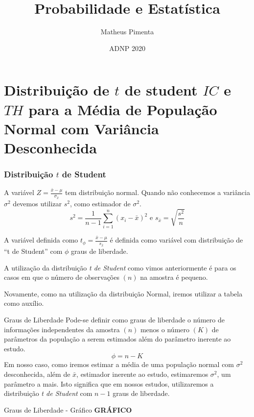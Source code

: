 \documentclass[hyperref={pdfpagelabels=false}]{beamer}
\title{Probabilidade e Estatística}
\author[Matheus Pimenta]{Matheus Pimenta}
\institute[UTFPR-CP]{\normalsize Universidade Tecnológica Federal do Paraná \\
	Câmpus Cornélio Procópio
}
\date{ADNP 2020}
\begin{document}
	
\begin{frame}
\titlepage
\end{frame} 




\section{Distribuição de $t$ de student $IC$ e $TH$ para a Média de População Normal com Variância Desconhecida} 

\begin{frame}
\frametitle{Distribuição $t$ de Student}
A variável $Z = \displaystyle \frac{\bar{x} - \mu}{\sigma_{\bar{x}}}$ tem distribuição normal. Quando não conhecemos a variância $\sigma^2$ devemos utilizar $s^2$, como estimador de $\sigma^2$. \pause
$$s^2 = \displaystyle \frac{1}{n-1}\sum_{i=1}^{n}(x_i - \bar{x})^2 \text{ e } s_{\bar{x}}=\sqrt{\frac{s^2}{n}}$$ \pause

A variável definida como $t_{\phi} = \displaystyle \frac{\bar{x} - \mu}{s_{\bar{x}}}$ é definida como variável com distribuição de ``t de Student'' com $\phi$ graus de liberdade.

\pause
A utilização da distribuição \emph{t de Student} como vimos anteriormente é para os casos em que o número de observações $(n)$ na amostra é pequeno. \pause

Novamente, como na utilização da distribuição Normal, iremos utilizar a tabela como auxílio.
\end{frame}

\begin{frame}{Graus de Liberdade}
Pode-se definir como graus de liberdade o número de informações independentes da amostra $(n)$ menos o número $(K)$ de parâmetros da população a serem estimados além do parâmetro inerente ao estudo. \pause
$$\phi = n - K$$ \pause
Em nosso caso, como iremos estimar a média de uma população normal com $\sigma^2$ desconhecida, além de $\bar{x}$, estimador inerente ao estudo, estimaremos $\sigma^2$, um parâmetro a mais. \pause Isto significa que em nossos estudos, utilizaremos a distribuição \emph{t de Student} com $n - 1$ graus de liberdade.

\end{frame}

\begin{frame}{Graus de Liberdade - Gráfico}
{\bf GRÁFICO}
\end{frame}
\end{document}
